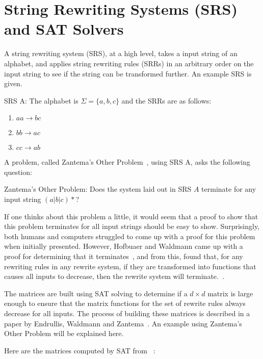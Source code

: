 \chapter{String Rewriting Systems (SRS) and SAT Solvers} \label{sec:SRSandSAT}
A string rewriting system (SRS), at a high level, takes a input string of an alphabet, and applies string rewriting rules (SRRs) in an arbitrary order on the input string to see if the string can be transformed further. An example SRS is given.
\begin{definition}{SRS A:} 
The alphabet is $\Sigma = \{a, b, c\}$ and the SRRs are as follows:
\begin{enumerate}
    \item $aa \rightarrow bc$
    \item $bb \rightarrow ac$
    \item $cc \rightarrow ab$
\end{enumerate}
\end{definition}
A problem, called Zantema's Other Problem~\cite{Hofbauer:2006:TA:1142725.1711178}, using SRS A, asks the following question:\par\noindent
\begin{question}{Zantema's Other Problem:}
Does the system laid out in SRS $A$ terminate for any input string $(a|b|c)*$?
\end{question}
If one thinks about this problem a little, it would seem that a proof to show that this problem terminates for all input strings should be easy to show.  Surprisingly, both humans and computers struggled to come up with a proof for this problem when initially presented.  However, Hofbuaer and Waldmann came up with a proof for determining that it terminates~\cite{Hofbauer:2006:TA:1142725.1711178}, and from this, found that, for any rewriting rules in any rewrite system, if they are transformed into functions that causes all inputs to decrease, then the rewrite system will terminate.~\cite{Hofbauer2006}. \par
The matrices are built using SAT solving to determine if a $d \times d$ matrix is large enough to ensure that the matrix functions for the set of rewrite rules always decrease for all inputs. The process of building these matrices is described in a paper by Endrullis, Waldmann and Zantema~\cite{Endrullis2006}. An example using Zantema's Other Problem will be explained here.\par
Here are the matrices computed by SAT from ~\cite{Hofbauer:2006:TA:1142725.1711178}:
